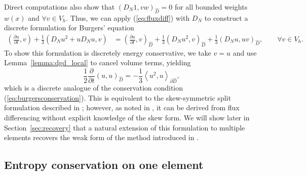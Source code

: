 \documentclass[preprint,10pt]{article}
\theoremstyle{definition}
\theoremstyle{lemma}
\theoremstyle{theorem}
\theoremstyle{assumption}
\newcommand{\pd}[2]{\frac{\partial#1}{\partial#2}}
\newcommand{\LRp}[1]{\left( #1 \right)}
\newcommand{\LRa}[1]{\left\langle #1 \right\rangle}
\begin{document}
Direct computations also show that $\LRp{D_N 1,vw}_{\widehat{D}} = 0$ for all bounded weights $w(x)$ and $\forall v \in V_h$.  Thus, we can apply (\ref{eq:fluxdiff}) with $D_N$ to construct a discrete formulation for Burgers' equation
\begin{align}
\LRp{\pd{u}{t},v} + \frac{1}{3}\LRp{D_N u^2 + uD_Nu,v} &= \LRp{\pd{u}{t},v}_{\widehat{D}} + \frac{1}{3}\LRp{D_N u^2,v}_{\widehat{D}} + \frac{1}{3}\LRp{D_Nu,uv}_{\widehat{D}},
\qquad \forall v\in V_h.
\label{eq:burgersdiscrete}
\end{align}
To show this formulation is discretely energy conservative, we take $v=u$ and use Lemma~\ref{lemma:dgd_local} to cancel volume terms, yielding
\[
\frac{1}{2}\pd{}{t}\LRp{u,u}_{\widehat{D}} = -\frac{1}{3}\LRa{u^2,u}_{\partial \widehat{D}},
\]
which is a discrete analogue of the conservation condition (\ref{eq:burgersconservation}).  This is equivalent to the skew-symmetric split formulation described in \cite{gassner2013skew}; however, as noted in \cite{chen2017entropy}, it can be derived from flux differencing without explicit knowledge of the skew form.  We will show later in Section~\ref{sec:recovery} that a natural extension of this formulation to multiple elements recovers the weak form of the method introduced in \cite{ranocha2017extended}.  



\subsection{Entropy conservation on one element}
\end{document}
